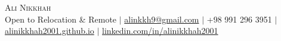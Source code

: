 \begin{center}
  \Huge \textsc{Ali Nikkhah} \\ \vspace{2pt}
  \small
  Open to Relocation \& Remote $|$
  \href{mailto:alinkkh9@gmail.com}{alinkkh9@gmail.com} $|$
  +98 991 296 3951 $|$
  \href{https://alinikkhah2001.github.io}{alinikkhah2001.github.io} $|$
  \href{https://linkedin.com/in/alinikkhah2001}{linkedin.com/in/alinikkhah2001}
\end{center}
